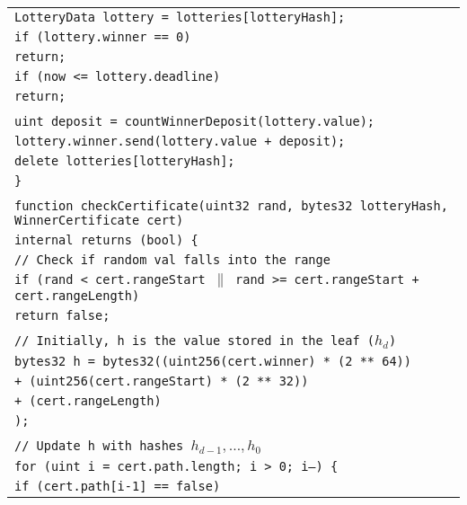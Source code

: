 \documentclass[a4paper]{article}
\begin{document}
\begin{tabularx}{\linewidth}{l}
        \qquad\qquad\texttt{LotteryData lottery = lotteries[lotteryHash];}\\
        \qquad\qquad\texttt{if (lottery.winner == 0)}\\
        \qquad\qquad\qquad\texttt{return;}\\
        \qquad\qquad\texttt{if (now <= lottery.deadline)}\\
        \qquad\qquad\qquad\texttt{return;}\\
        \\
        \qquad\qquad\texttt{uint deposit = countWinnerDeposit(lottery.value);}\\
        \qquad\qquad\texttt{lottery.winner.send(lottery.value + deposit);}\\
        \qquad\qquad\texttt{delete lotteries[lotteryHash];}\\
        \qquad\texttt{\}}\\
        \\
        \qquad\texttt{function checkCertificate(uint32 rand, bytes32 lotteryHash, WinnerCertificate cert)}\\
        \qquad\qquad\qquad\qquad\qquad\qquad\qquad\qquad\texttt{internal returns (bool) \{}\\
        \qquad\qquad\texttt{// Check if random val falls into the range}\\
        \qquad\qquad\texttt{if (rand < cert.rangeStart $\|$ rand >= cert.rangeStart + cert.rangeLength)}\\
        \qquad\qquad\qquad\texttt{return false;}\\
        \\
        \qquad\qquad\texttt{// Initially, h is the value stored in the leaf ($h_d$)}\\
        \qquad\qquad\texttt{bytes32 h = bytes32((uint256(cert.winner) * (2 ** 64))}\\
        \qquad\qquad\qquad\qquad\qquad\qquad\texttt{+ (uint256(cert.rangeStart) * (2 ** 32))}\\
        \qquad\qquad\qquad\qquad\qquad\qquad\texttt{+ (cert.rangeLength)}\\
        \qquad\qquad\qquad\qquad\qquad\texttt{);}\\
        \\
        \qquad\qquad\texttt{// Update h with hashes $h_{d-1}, \ldots, h_0$}\\
        \qquad\qquad\texttt{for (uint i = cert.path.length; i > 0; i--) \{}\\
        \qquad\qquad\qquad\texttt{if (cert.path[i-1] == false)}\\

\end{tabularx}
\end{document}
